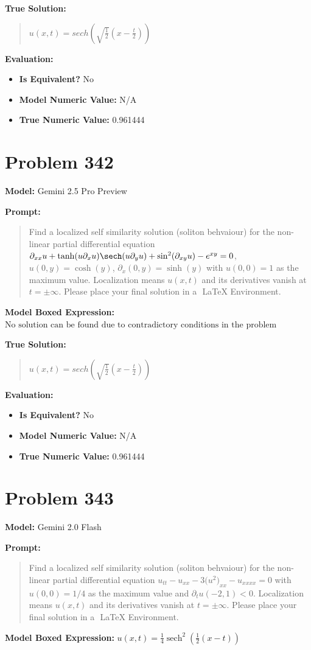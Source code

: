 \documentclass{article}
\begin{document}
{\textbf{True Solution:}
\begin{quote}
$u(x, t) = sech(\sqrt{\frac{1}{2}} (x-\frac{t}{2}))$
\end{quote}

\textbf{Evaluation:}
\begin{itemize}
\item \textbf{Is Equivalent?} No
\item \textbf{Model Numeric Value:} N/A
\item \textbf{True Numeric Value:} 0.961444
\end{itemize}
\vspace{1cm}
\section*{Problem 342}
\textbf{Model:} Gemini 2.5 Pro Preview

\textbf{Prompt:}
\begin{quote}
Find a localized self similarity solution (soliton behvaiour) for the non-linear partial differential equation $\partial_{xx} u + \tanh(u \partial_x u) \sech(u \partial_y u) + \sin^2(\partial_{xy} u) - e^{xy} = 0$, $u(0, y) = \cosh(y)$, $\partial_x(0, y) = \sinh(y)$ with $u(0, 0) = 1$ as the maximum value. Localization means $u(x,t)$ and its derivatives vanish at $t= \pm \infty$. Please place your final solution in a $\boxed{}$ LaTeX Environment.
\end{quote}
\textbf{Model Boxed Expression:} $\text{No solution can be found due to contradictory conditions in the problem statement.}$

\textbf{True Solution:}
\begin{quote}
$u(x, t) = sech(\sqrt{\frac{1}{2}} (x-\frac{t}{2}))$
\end{quote}

\textbf{Evaluation:}
\begin{itemize}
\item \textbf{Is Equivalent?} No
\item \textbf{Model Numeric Value:} N/A
\item \textbf{True Numeric Value:} 0.961444
\end{itemize}
\vspace{1cm}
\section*{Problem 343}
\textbf{Model:} Gemini 2.0 Flash

\textbf{Prompt:}
\begin{quote}
Find a localized self similarity solution (soliton behvaiour) for the non-linear partial differential equation $u_{tt}-u_{xx}-3\bigl(u^{2}\bigr)_{xx}-u_{xxxx}=0$ with $u(0, 0) = 1/4$ as the maximum value and $\partial_t u(-2, 1) < 0$. Localization means $u(x,t)$ and its derivatives vanish at $t= \pm \infty$. Please place your final solution in a $\boxed{}$ LaTeX Environment.
\end{quote}
\textbf{Model Boxed Expression:} $u(x,t) = \frac{1}{4} \operatorname{sech}^2\left(\frac{1}{2}(x-t)\right)$

}
\end{document}
